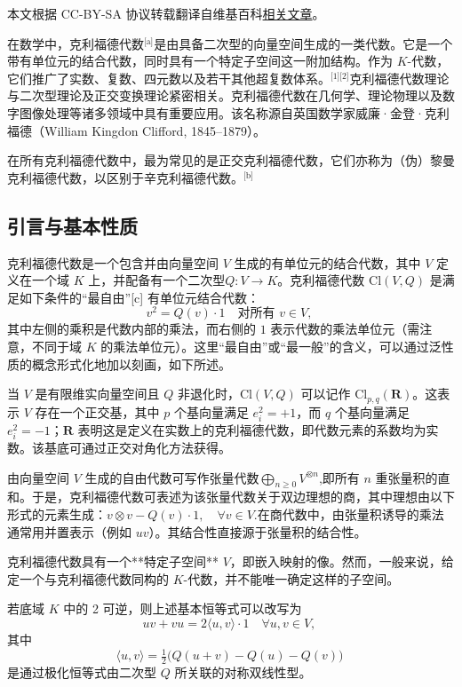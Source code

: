 
本文根据 CC-BY-SA 协议转载翻译自维基百科\href{https://en.wikipedia.org/wiki/Clifford_algebra}{相关文章}。

在数学中，克利福德代数\(^\text{[a]}\)是由具备二次型的向量空间生成的一类代数。它是一个带有单位元的结合代数，同时具有一个特定子空间这一附加结构。作为 $K$-代数，它们推广了实数、复数、四元数以及若干其他超复数体系。\(^\text{[1][2]}\)克利福德代数理论与二次型理论及正交变换理论紧密相关。克利福德代数在几何学、理论物理以及数字图像处理等诸多领域中具有重要应用。该名称源自英国数学家威廉·金登·克利福德（William Kingdon Clifford, 1845–1879）。

在所有克利福德代数中，最为常见的是正交克利福德代数，它们亦称为（伪）黎曼克利福德代数，以区别于辛克利福德代数。\(^\text{[b]}\)

\subsection{引言与基本性质}
克利福德代数是一个包含并由向量空间 $V$ 生成的有单位元的结合代数，其中 $V$ 定义在一个域 $K$ 上，并配备有一个二次型$Q: V \to K$。克利福德代数 $\mathrm{Cl}(V, Q)$ 是满足如下条件的“最自由”[c] 有单位元结合代数：
$$
v^{2} = Q(v) \cdot 1 \quad \text{对所有 } v \in V,~
$$
其中左侧的乘积是代数内部的乘法，而右侧的 $1$ 表示代数的乘法单位元（需注意，不同于域 $K$ 的乘法单位元）。这里“最自由”或“最一般”的含义，可以通过泛性质的概念形式化地加以刻画，如下所述。

当 $V$ 是有限维实向量空间且 $Q$ 非退化时，$\mathrm{Cl}(V, Q)$ 可以记作 $\mathrm{Cl}_{p,q}(\mathbf{R})$。这表示 $V$ 存在一个正交基，其中 $p$ 个基向量满足 $e_i^2 = +1$，而 $q$ 个基向量满足 $e_i^2 = -1$；$\mathbf{R}$ 表明这是定义在实数上的克利福德代数，即代数元素的系数均为实数。该基底可通过正交对角化方法获得。

由向量空间 $V$ 生成的自由代数可写作张量代数$\bigoplus_{n \geq 0} V^{\otimes n}$,即所有 $n$ 重张量积的直和。于是，克利福德代数可表述为该张量代数关于双边理想的商，其中理想由以下形式的元素生成：$v \otimes v - Q(v) \cdot 1, \quad \forall v \in V$.在商代数中，由张量积诱导的乘法通常用并置表示（例如 $uv$）。其结合性直接源于张量积的结合性。

克利福德代数具有一个**特定子空间** $V$，即嵌入映射的像。然而，一般来说，给定一个与克利福德代数同构的 $K$-代数，并不能唯一确定这样的子空间。

若底域 $K$ 中的 2 可逆，则上述基本恒等式可以改写为
$$
uv + vu = 2 \langle u, v \rangle \cdot 1 \quad \forall u, v \in V,~
$$
其中
$$
\langle u, v \rangle = \tfrac{1}{2}\big(Q(u+v) - Q(u) - Q(v)\big)~
$$
是通过极化恒等式由二次型 $Q$ 所关联的对称双线性型。

